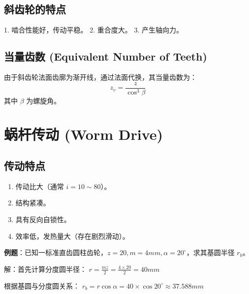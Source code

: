 \subsection{斜齿轮的特点}
1. 啮合性能好，传动平稳。
2. 重合度大。
3. 产生轴向力。

\subsection{当量齿数 (Equivalent Number of Teeth)}
由于斜齿轮法面齿廓为渐开线，通过法面代换，其当量齿数为：
\begin{equation}
	z_v = \frac{z}{\cos^3 \beta}
\end{equation}
其中 $\beta$ 为螺旋角。

\section{蜗杆传动 (Worm Drive)}

\subsection{传动特点}
\begin{enumerate}
	\item 传动比大（通常 $i = 10 \sim 80$）。
	\item 结构紧凑。
	\item 具有反向自锁性。
	\item 效率低，发热量大（存在剧烈滑动）。
\end{enumerate}

\begin{solution}
	\textbf{例题}：已知一标准直齿圆柱齿轮，$z=20, m=4mm, \alpha=20^\circ$，求其基圆半径 $r_b$。
	
	解：首先计算分度圆半径：
	$r = \frac{mz}{2} = \frac{4 \times 20}{2} = 40 mm$
	
	根据基圆与分度圆关系：
	$r_b = r \cos \alpha = 40 \times \cos 20^\circ \approx 37.588 mm$
\end{solution}
